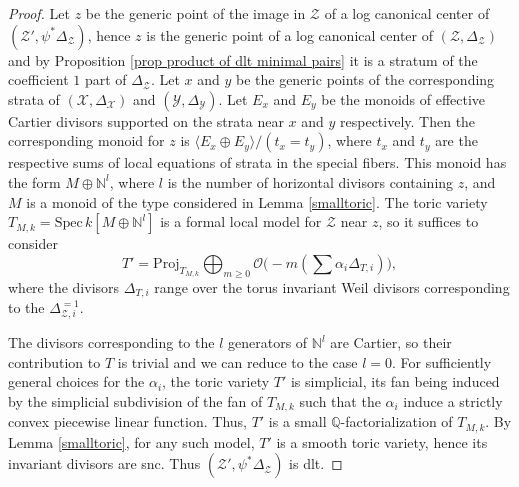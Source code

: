 \documentclass{amsart}%
\numberwithin{equation}{subsection}
\theoremstyle{plain2}
\theoremstyle{definition2}
\theoremstyle{stepstyle}
\theoremstyle{point}
\theoremstyle{subpoint}
\newcommand{\Q}{\ensuremath{\mathbb{Q}}}
\newcommand{\cX}{\ensuremath{\mathscr{X}}}
\newcommand{\cY}{\ensuremath{\mathscr{Y}}}
\newcommand{\cZ}{\ensuremath{\mathscr{Z}}}
\renewcommand{\cY}{\ensuremath{\mathscr{Y}}}
\newcommand{\Spec}{\ensuremath{\mathrm{Spec}\,}}
\begin{document}
\begin{proof}
Let $z$ be the generic point of the image in $\cZ$ of a log canonical center of $(\cZ', \psi^*\Delta_\cZ)$, hence $z$ is the generic point of a log canonical center of $(\cZ,\Delta_{\cZ})$ and by Proposition \ref{prop product of dlt minimal pairs} it is a stratum of the coefficient $1$ part of $\Delta_{\cZ}$. Let $x$ and $y$ be the generic points of the corresponding strata of $(\cX,\Delta_\cX)$ and $(\cY, \Delta_\cY)$. Let $E_x$ and $E_y$ be the monoids of effective Cartier divisors supported on the strata near $x$ and $y$ respectively. Then the corresponding monoid for $z$ is $\langle E_x \oplus E_y \rangle /(t_x=t_y)$, where $t_x$ and $t_y$ are the respective sums of local equations of strata in the special fibers. This monoid has the form $M \oplus \mathbb{N}^l$, where $l$ is the number of horizontal divisors containing $z$, and $M$ is a monoid of the type considered in Lemma \ref{smalltoric}. The toric variety $T_{M,k}=\Spec k[M \oplus \mathbb{N}^l]$ is a formal local model for $\cZ$ near $z$, so it suffices to consider $$T'=\text{Proj}_{T_{M,k}} \bigoplus_{m \geqslant 0} \mathcal{O}\big(-m(\sum \alpha_i \Delta_{T,i})\big),$$ where the divisors $\Delta_{T,i}$ range over the torus invariant Weil divisors corresponding to the $\Delta_{\cZ,i}^{=1}$.

The divisors corresponding to the $l$ generators of $\mathbb{N}^l$ are Cartier, so their contribution to $T$ is trivial and we can reduce to the case $l=0$. For sufficiently general choices for the $\alpha_i$, the toric variety $T'$ is simplicial, its fan being induced by the simplicial subdivision of the fan of $T_{M,k}$ such that the $\alpha_i$ induce a strictly convex piecewise linear function. Thus, $T'$ is a small $\Q$-factorialization of $T_{M,k}$. By Lemma \ref{smalltoric}, for any such model, $T'$ is a smooth toric variety, hence its invariant divisors are snc. Thus $(\cZ', \psi^*\Delta_\cZ)$ is dlt.


\end{proof}
\end{document}
